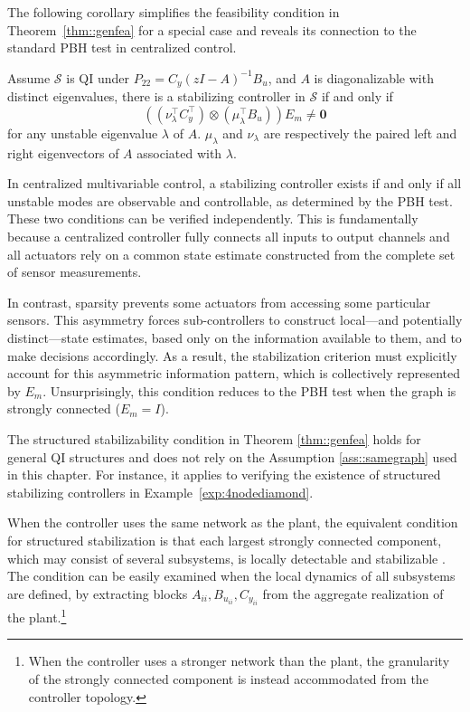 The following corollary simplifies the feasibility condition in Theorem~\ref{thm::genfea} for a special case and reveals its connection to the standard PBH test in centralized control.
\begin{cor}\label{cor:diagA}
Assume \(\mathcal{S}\) is QI under \(P_{22} = C_y(zI -A)^{-1}B_u\), and \(A\) is diagonalizable with distinct eigenvalues, there is a stabilizing controller in \(\mathcal{S}\) if and only if
\[
\left((\nu_\lambda^\top C_y^\top) \otimes (\mu_\lambda^\top B_u)\right) E_m \neq \mathbf{0}
\]
for any unstable eigenvalue \(\lambda\) of \(A\). \(\mu_\lambda\) and \(\nu_\lambda\) are respectively the paired left and right eigenvectors of \(A\) associated with \(\lambda\).
\end{cor}
\begin{rem}
In centralized multivariable control, a stabilizing controller exists if and only if all unstable modes are observable and controllable, as determined by the PBH test. These two conditions can be verified independently. This is fundamentally because a centralized controller fully connects all inputs to output channels and all actuators rely on a common state estimate constructed from the complete set of sensor measurements. 

In contrast, sparsity prevents some actuators from accessing some particular sensors. This asymmetry forces sub-controllers to construct local—and potentially distinct—state estimates, based only on the information available to them, and to make decisions accordingly. As a result, the stabilization criterion must explicitly account for this asymmetric information pattern, which is collectively represented by \(E_m\). Unsurprisingly, this condition reduces to the PBH test when the graph is strongly connected (\(E_m = I\)).

\end{rem}
\begin{rem}
The structured stabilizability condition in Theorem \ref{thm::genfea} holds for general QI structures and does not rely on the Assumption \ref{ass::samegraph} used in this chapter. For instance, it applies to verifying the existence of structured stabilizing controllers in Example~\ref{exp:4nodediamond}.
\end{rem}


When the controller uses the same network as the plant, the equivalent condition for structured stabilization is that each largest strongly connected component, which may consist of several subsystems, is locally detectable and stabilizable \cite{Lessard2012strstab}.
The condition can be easily examined when the local dynamics of all subsystems are defined, by extracting blocks \(A_{ii}, B_{u_{ii}}, C_{y_{ii}}\) from the aggregate realization of the plant.\footnote{When the controller uses a stronger network than the plant, the granularity of the strongly connected component is instead accommodated from the controller topology.}


